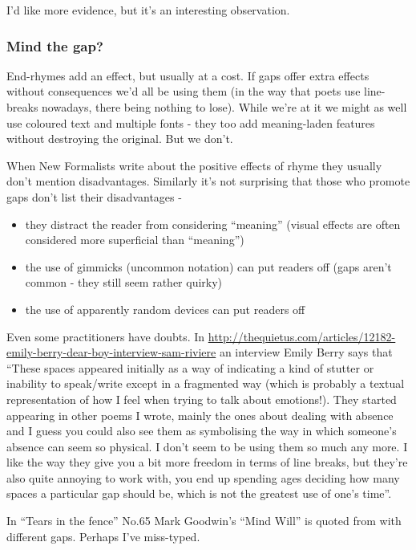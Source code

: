 \documentclass[11pt]{article}
\begin{document}
I'd like more evidence, but it's an interesting observation.

\subsubsection*{Mind the gap?}
End-rhymes add an effect, but usually at a cost. If gaps offer extra effects without consequences we'd all be using them (in the way that poets use line-breaks nowadays, there being nothing to lose).  While we're at it we might as well use coloured text and multiple fonts - they too add meaning-laden features without destroying the original. But we don't.

When New Formalists write about the positive effects of rhyme they usually don't mention disadvantages. Similarly it's not surprising that those who promote gaps don't list their disadvantages - 
\begin{itemize}

\item they distract the reader from considering ``meaning'' (visual effects are often considered more superficial than ``meaning'')
\item the use of gimmicks (uncommon notation) can put readers off (gaps aren't common - they still seem rather quirky) 
\item the use of apparently random devices can put readers off
\end{itemize}

Even some practitioners have doubts. In \url{http://thequietus.com/articles/12182-emily-berry-dear-boy-interview-sam-riviere} an interview Emily Berry says that ``These spaces appeared initially as a way of indicating a kind of stutter or inability to speak/write except in a fragmented way (which is probably a textual representation of how I feel when trying to talk about emotions!). They started appearing in other poems I wrote, mainly the ones about dealing with absence and I guess you could also see them as symbolising the way in which someone’s absence can seem so physical. I don’t seem to be using them so much any more. I like the way they give you a bit more freedom in terms of line breaks, but they’re also quite annoying to work with, you end up spending ages deciding how many spaces a particular gap should be, which is not the greatest use of one’s time''. 

In ``Tears in the fence'' No.65 Mark Goodwin's ``Mind Will'' is quoted from with different gaps. Perhaps I've miss-typed.
\end{document}
